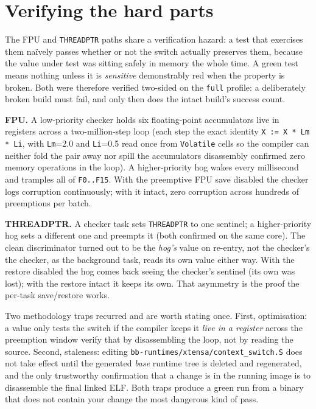 \section{Verifying the hard parts}

The FPU and \texttt{THREADPTR} paths share a verification hazard: a test that
exercises them na\"ively passes whether or not the switch actually preserves them,
because the value under test was sitting safely in memory the whole time. A green
test means nothing unless it is \emph{sensitive} \textemdash{} demonstrably red
when the property is broken. Both were therefore verified two-sided on the
\texttt{full} profile: a deliberately broken build must fail, and only then does
the intact build's success count.

\textbf{FPU.} A low-priority checker holds six floating-point accumulators live in
registers across a two-million-step loop (each step the exact identity
\texttt{X := X * Lm * Li}, with \texttt{Lm}=2.0 and \texttt{Li}=0.5 read once from
\texttt{Volatile} cells so the compiler can neither fold the pair away nor spill
the accumulators \textemdash{} disassembly confirmed zero memory operations in the
loop). A higher-priority hog wakes every millisecond and tramples all of
\texttt{F0..F15}. With the preemptive FPU save disabled the checker logs corruption
continuously; with it intact, zero corruption across hundreds of preemptions per
batch.

\textbf{THREADPTR.} A checker task sets \texttt{THREADPTR} to one sentinel; a
higher-priority hog sets a different one and preempts it (both confirmed on the
same core). The clean discriminator turned out to be the \emph{hog's} value on
re-entry, not the checker's \textemdash{} the checker, as the background task,
reads its own value either way. With the restore disabled the hog comes back
seeing the checker's sentinel (its own was lost); with the restore intact it keeps
its own. That asymmetry is the proof the per-task save/restore works.

Two methodology traps recurred and are worth stating once. First, optimisation:
a value only tests the switch if the compiler keeps it \emph{live in a register}
across the preemption window \textemdash{} verify that by disassembling the loop,
not by reading the source. Second, staleness: editing
\texttt{bb-runtimes/xtensa/context\_switch.S} does not take effect until the
generated \emph{base} runtime tree is deleted and regenerated, and the only
trustworthy confirmation that a change is in the running image is to disassemble
the final linked ELF. Both traps produce a green run from a binary that does not
contain your change \textemdash{} the most dangerous kind of pass.
